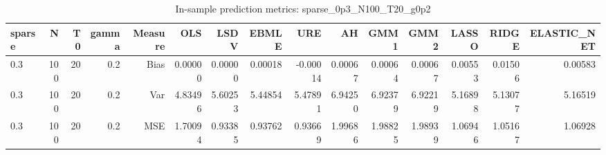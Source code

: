 \begin{table}[!htbp]\centering
\caption{In-sample prediction metrics: sparse_0p3_N100_T20_g0p2}
\label{tab:table2_sparse_0p3_N100_T20_g0p2}
\begin{tabular}{lrrrrrrrrrrrrrr}
\hline
sparse & N & T0 & gamma & Measure & OLS & LSDV & EBMLE & URE & AH & GMM1 & GMM2 & LASSO & RIDGE & ELASTIC_NET \\
\hline
0.3 & 100 & 20 & 0.2 & Bias & 0.00000 & 0.00000 & 0.00018 & -0.00014 & 0.00067 & 0.00064 & 0.00067 & 0.00553 & 0.01506 & 0.00583 \\
0.3 & 100 & 20 & 0.2 & Var & 4.83496 & 5.60253 & 5.44854 & 5.47891 & 6.94250 & 6.92379 & 6.92219 & 5.16898 & 5.13077 & 5.16519 \\
0.3 & 100 & 20 & 0.2 & MSE & 1.70094 & 0.93385 & 0.93762 & 0.93669 & 1.99686 & 1.98825 & 1.98939 & 1.06946 & 1.05167 & 1.06928 \\
\hline
\end{tabular}
\end{table}

